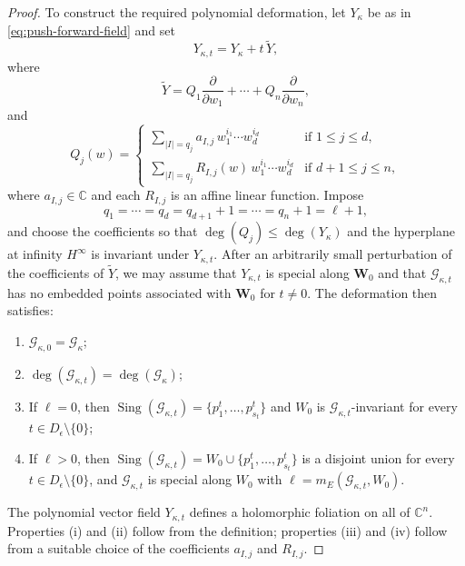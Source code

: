 \documentclass[10pt,twoside]{amsart}
\numberwithin{equation}{section}
\theoremstyle{definition}
\theoremstyle{remark}
\DeclareMathOperator{\sing}{Sing}
\newcommand{\C}{\mathbb{C}}
\newcommand{\W}{\mathbf{W}}
\begin{document}
\begin{proof}
To construct the required polynomial deformation, let $Y_\kappa$ be as in \eqref{eq:push-forward-field} and set
\begin{equation}
Y_{\kappa,t}=Y_\kappa+t\,\widetilde{Y},
\end{equation}
where
\[
\widetilde{Y}=Q_1\frac{\partial}{\partial w_1}+\cdots+Q_n\frac{\partial}{\partial w_n},
\]
and
\[
Q_j(w)=
\begin{cases}
\displaystyle\sum_{|I|=q_j} a_{I,j}\, w_1^{i_1}\cdots w_d^{i_d} & \text{if } 1\leq j\leq d,\\[6pt]
\displaystyle\sum_{|I|=q_j} R_{I,j}(w)\, w_1^{i_1}\cdots w_d^{i_d} & \text{if } d+1\leq j\leq n,
\end{cases}
\]
where $a_{I,j}\in\C$ and each $R_{I,j}$ is an affine linear function.
Impose
\[
q_1=\cdots=q_d=q_{d+1}+1=\cdots=q_n+1=\ell+1,
\]
and choose the coefficients so that $\deg(Q_j)\leq \deg(Y_\kappa)$ and the hyperplane at infinity $H^\infty$ is invariant under $Y_{\kappa,t}$.
After an arbitrarily small perturbation of the coefficients of $\widetilde Y$, we may assume that $Y_{\kappa,t}$ is special along $\W_0$ and that $\mathcal G_{\kappa,t}$ has no embedded points associated with $\W_0$ for $t\neq0$. The deformation then satisfies:
\begin{enumerate}
\item[(i)] $\mathcal{G}_{\kappa,0}=\mathcal{G}_\kappa$;
\item[(ii)] $\deg(\mathcal{G}_{\kappa,t})=\deg(\mathcal{G}_\kappa)$;
\item[(iii)] If $\ell=0$, then $\sing(\mathcal{G}_{\kappa,t})=\{p_1^t,\ldots,p_{s_t}^t\}$ and $W_0$ is $\mathcal{G}_{\kappa,t}$-invariant for every $t\in D_\epsilon\setminus\{0\}$;
\item[(iv)] If $\ell>0$, then $\sing(\mathcal{G}_{\kappa,t})=W_0\cup\{p_1^t,\ldots,p_{s_t}^t\}$ is a disjoint union for every $t\in D_\epsilon\setminus\{0\}$, and $\mathcal{G}_{\kappa,t}$ is special along $W_0$ with $\ell=m_E(\mathcal{G}_{\kappa,t},W_0)$.
\end{enumerate}

The polynomial vector field $Y_{\kappa,t}$ defines a holomorphic foliation on all of $\C^n$. Properties (i) and (ii) follow from the definition; properties (iii) and (iv) follow from a suitable choice of the coefficients $a_{I,j}$ and $R_{I,j}$.


\end{proof}
\end{document}
